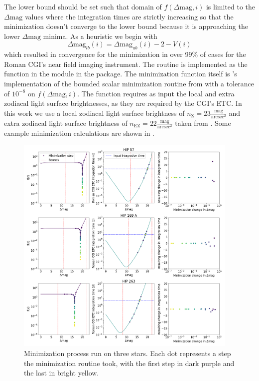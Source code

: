 The lower bound should be set such that domain of $f\left(\Delta\textrm{mag},
i\right)$ is limited to the $\Delta\textrm{mag}$ values where the integration
times are strictly increasing so that the minimization doesn't converge to the
lower bound because it is approaching the lower $\Delta\textrm{mag}$ minima. As
a heuristic we begin with
\begin{equation}
  \Delta\textrm{mag}_{lb}(i) = \Delta\textrm{mag}_{ub}(i) - 2 - V(i)
  \label{eq:dMag_lb}
\end{equation}
which resulted in convergence for the minimization in over 99\% of cases for
the Roman CGI's near field imaging instrument. The routine is implemented
as the  function in the 
module in the  package. The minimization function itself
is 's \citep{virtanenSciPyFundamental2020} implementation of the
bounded scalar minimization routine from \citet{forsytheComputerMethods1977}
with a tolerance of $10^{-8}$ on $f(\Delta\textrm{mag}, i)$. The function
requires as input the local and extra zodiacal light surface brightnesses,
as they are required by the CGI's ETC. In this work we use a local zodiacal
light surface brightness of $n_{\textrm{Z}}=23
\frac{\textrm{mag}}{\textrm{arcsec}^2}$ and extra zodiacal light surface
brightness of $n_{\textrm{EZ}}=22 \frac{\textrm{mag}}{\textrm{arcsec}^2}$
taken from \citet{starkMaximizingExoEarthCandidate2014}. Some example
minimization calculations are shown in .
\begin{figure}
  \begin{center}
    \includegraphics[width=0.95\textwidth]{ch2/figures/minimzation_star_comp.png}
  \end{center}
  \caption{Minimization process run on three stars. Each dot represents a step the
  minimization routine took, with the first step in dark purple and the last in
bright yellow.}
  \label{fig:minimization_star_comp}
\end{figure}

